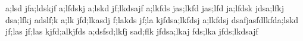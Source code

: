 a;lsd jfa;ldskjf a;lfdskj a;lskd jf;lkdsajf
a;lkfds jas;lkfd jas;lfd ja;lfdsk jdsa;lfkj
dsa;lfkj adslf;k a;lk jfd;lkasdj f;lakds jf;la
kjfdsa;lkfdsj a;lkfdsj dsafjasfdlkfda;lskd jf;las jf;las
kjfd;alkjfds a;dsfsd;lkfj sad;flk jfdsa;lkaj
fds;lka jfds;lkdsajf
